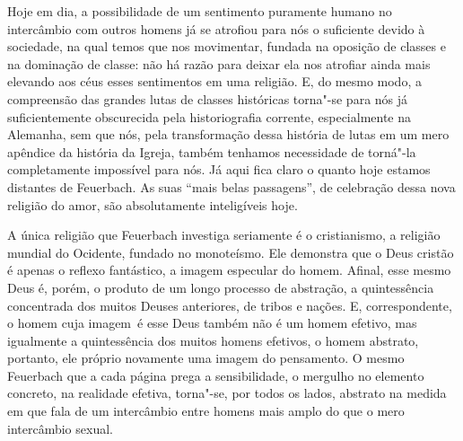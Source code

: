 Hoje em dia, a possibilidade de um sentimento puramente humano no
intercâmbio com outros homens já se atrofiou para nós o suficiente
devido à sociedade, na qual temos que nos movimentar, fundada na
oposição de classes e na dominação de classe: não há razão para deixar
ela nos atrofiar ainda mais elevando aos céus esses sentimentos em uma
religião. E, do mesmo modo, a compreensão das grandes lutas de classes
históricas torna"-se para nós já suficientemente obscurecida pela
historiografia corrente, especialmente na Alemanha, sem que nós, pela
transformação dessa história de lutas em um mero apêndice da história da
Igreja, também tenhamos necessidade de torná"-la completamente impossível %
para nós. Já aqui fica claro o quanto hoje estamos distantes %
de Feuerbach.
As suas ``mais belas passagens'', de celebração dessa nova religião do
amor, são absolutamente inteligíveis hoje.

A única religião
que Feuerbach investiga
seriamente é o cristianismo, a religião mundial do Ocidente, fundado no
monoteísmo. Ele demonstra que o Deus cristão é apenas o reflexo
fantástico, a imagem especular do homem. Afinal, esse mesmo Deus é, %
porém, o produto de um longo processo de abstração, a quintessência
concentrada dos muitos Deuses anteriores, de tribos e nações. E,
correspondente, o homem cuja imagem\est\ é esse Deus também não é um homem %
efetivo, mas igualmente a quintessência dos muitos homens efetivos, o %
homem abstrato, portanto, ele próprio novamente uma imagem do
pensamento. O
mesmo Feuerbach que
a cada página prega a sensibilidade, o mergulho no elemento concreto, na
realidade efetiva, torna"-se, por todos os lados, abstrato na medida em
que fala de um intercâmbio entre homens mais amplo do que o mero
intercâmbio sexual.

